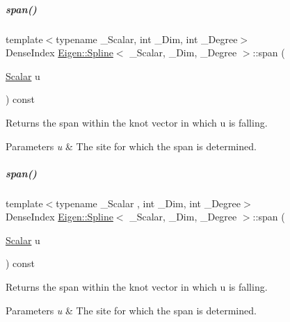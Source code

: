 \mbox{\label{group___splines___module_ab62751802b4cc237aadb0dbf3455df98}} 
\subparagraph{\texorpdfstring{span()}{span()}\hspace{0.1cm}{\footnotesize\ttfamily [1/2]}}
{\footnotesize\ttfamily template$<$typename \+\_\+\+Scalar, int \+\_\+\+Dim, int \+\_\+\+Degree$>$ \\
Dense\+Index \hyperlink{group___splines___module_class_eigen_1_1_spline}{Eigen\+::\+Spline}$<$ \+\_\+\+Scalar, \+\_\+\+Dim, \+\_\+\+Degree $>$\+::span (\begin{DoxyParamCaption}\item[{\hyperlink{group___splines___module_a8cafd78b564825c76fbb3419653d9742}{Scalar}}]{u }\end{DoxyParamCaption}) const}



Returns the span within the knot vector in which u is falling. 


\begin{DoxyParams}{Parameters}
{\em u} & The site for which the span is determined. \\
\hline
\end{DoxyParams}
\mbox{\label{group___splines___module_ab62751802b4cc237aadb0dbf3455df98}} 
\subparagraph{\texorpdfstring{span()}{span()}\hspace{0.1cm}{\footnotesize\ttfamily [2/2]}}
{\footnotesize\ttfamily template$<$typename \+\_\+\+Scalar , int \+\_\+\+Dim, int \+\_\+\+Degree$>$ \\
Dense\+Index \hyperlink{group___splines___module_class_eigen_1_1_spline}{Eigen\+::\+Spline}$<$ \+\_\+\+Scalar, \+\_\+\+Dim, \+\_\+\+Degree $>$\+::span (\begin{DoxyParamCaption}\item[{\hyperlink{group___splines___module_a8cafd78b564825c76fbb3419653d9742}{Scalar}}]{u }\end{DoxyParamCaption}) const}



Returns the span within the knot vector in which u is falling. 


\begin{DoxyParams}{Parameters}
{\em u} & The site for which the span is determined. \\
\hline
\end{DoxyParams}


